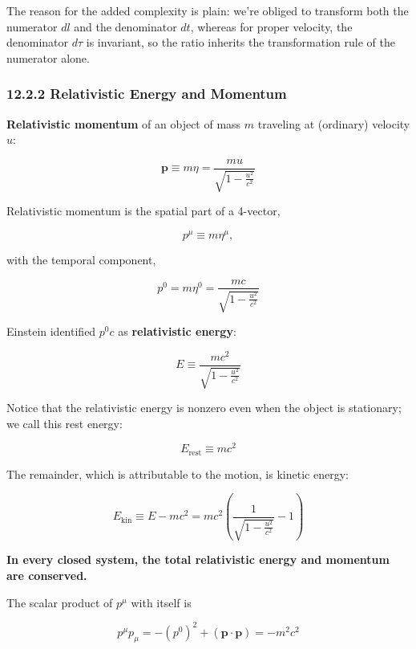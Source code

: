 \documentclass[12pt]{book}
\begin{document}
        The reason for the added complexity is plain: we’re obliged to transform both the numerator \(dl\) and the denominator \(dt\), whereas for proper velocity, the denominator \(d\tau\) is invariant, so the ratio inherits the transformation rule of the numerator
        alone.
        
    \subsubsection{12.2.2 Relativistic Energy and Momentum}
        \textbf{Relativistic momentum} of an object of mass \(m\) traveling at (ordinary) velocity \(u\):
        
        \[
        \bm{p} \equiv m\eta = \frac{mu}{\sqrt{1 - \frac{u^2}{c^2}}}
        \]
        
        Relativistic momentum is the spatial part of a 4-vector,
        
        \[
        p^\mu \equiv m\eta^\mu,
        \]
        
        with the temporal component,
        
        \[
        p^0 = m\eta^0 = \frac{mc}{\sqrt{1 - \frac{u^2}{c^2}}}
        \]
        
        Einstein identified \(p^0c\) as \textbf{relativistic energy}:
        
        \[
        E \equiv \frac{mc^2}{\sqrt{1 - \frac{u^2}{c^2}}}
        \]
        
        Notice that the relativistic energy is nonzero even when the object is stationary; we call this rest energy:
        
        \[
        E_\text{rest} \equiv mc^2
        \]
        
        The remainder, which is attributable to the motion, is kinetic energy:
        
        \[
        E_\text{kin} \equiv E - mc^2 = mc^2 \left(\frac{1}{\sqrt{1 - \frac{u^2}{c^2}}} - 1\right)
        \]

        \begin{center}
            \textbf{In every closed system, the total relativistic energy and momentum are conserved.}
        \end{center}
        
        The scalar product of \( p^\mu \) with itself is
        
        \[
        p^\mu p_\mu = -(p^0)^2 + (\bm{p} \cdot \bm{p}) = -m^2c^2
        \]
        
\end{document}
